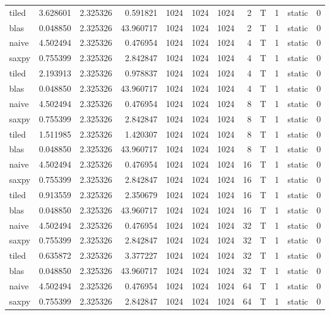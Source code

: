 \documentclass[
  12pt,
  xcolor = usenames,dvipsnames]{article}
\begin{document}
\begin{table}[!h]
{\begin{tabular}[t]{lrrrrrrrlrlr}
tiled & 3.628601 & 2.325326 & 0.591821 & 1024 & 1024 & 1024 & 2 & T & 1 & static & 0\\
blas & 0.048850 & 2.325326 & 43.960717 & 1024 & 1024 & 1024 & 2 & T & 1 & static & 0\\
naive & 4.502494 & 2.325326 & 0.476954 & 1024 & 1024 & 1024 & 4 & T & 1 & static & 0\\
\addlinespace
saxpy & 0.755399 & 2.325326 & 2.842847 & 1024 & 1024 & 1024 & 4 & T & 1 & static & 0\\
tiled & 2.193913 & 2.325326 & 0.978837 & 1024 & 1024 & 1024 & 4 & T & 1 & static & 0\\
blas & 0.048850 & 2.325326 & 43.960717 & 1024 & 1024 & 1024 & 4 & T & 1 & static & 0\\
naive & 4.502494 & 2.325326 & 0.476954 & 1024 & 1024 & 1024 & 8 & T & 1 & static & 0\\
saxpy & 0.755399 & 2.325326 & 2.842847 & 1024 & 1024 & 1024 & 8 & T & 1 & static & 0\\
\addlinespace
tiled & 1.511985 & 2.325326 & 1.420307 & 1024 & 1024 & 1024 & 8 & T & 1 & static & 0\\
blas & 0.048850 & 2.325326 & 43.960717 & 1024 & 1024 & 1024 & 8 & T & 1 & static & 0\\
naive & 4.502494 & 2.325326 & 0.476954 & 1024 & 1024 & 1024 & 16 & T & 1 & static & 0\\
saxpy & 0.755399 & 2.325326 & 2.842847 & 1024 & 1024 & 1024 & 16 & T & 1 & static & 0\\
tiled & 0.913559 & 2.325326 & 2.350679 & 1024 & 1024 & 1024 & 16 & T & 1 & static & 0\\
\addlinespace
blas & 0.048850 & 2.325326 & 43.960717 & 1024 & 1024 & 1024 & 16 & T & 1 & static & 0\\
naive & 4.502494 & 2.325326 & 0.476954 & 1024 & 1024 & 1024 & 32 & T & 1 & static & 0\\
saxpy & 0.755399 & 2.325326 & 2.842847 & 1024 & 1024 & 1024 & 32 & T & 1 & static & 0\\
tiled & 0.635872 & 2.325326 & 3.377227 & 1024 & 1024 & 1024 & 32 & T & 1 & static & 0\\
blas & 0.048850 & 2.325326 & 43.960717 & 1024 & 1024 & 1024 & 32 & T & 1 & static & 0\\
\addlinespace
naive & 4.502494 & 2.325326 & 0.476954 & 1024 & 1024 & 1024 & 64 & T & 1 & static & 0\\
saxpy & 0.755399 & 2.325326 & 2.842847 & 1024 & 1024 & 1024 & 64 & T & 1 & static & 0\\

\end{tabular}}
\end{table}
\end{document}
